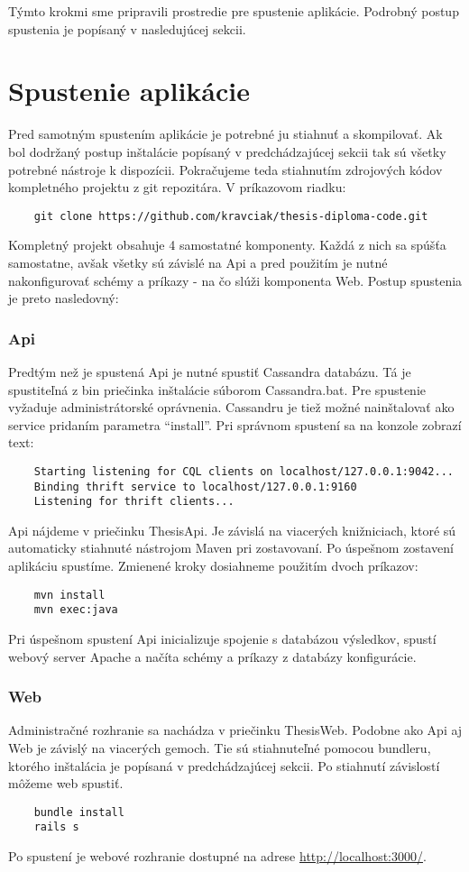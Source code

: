 	Týmto krokmi sme pripravili prostredie pre spustenie aplikácie. Podrobný postup spustenia je popísaný v nasledujúcej sekcii.

\section{Spustenie aplikácie}
	Pred samotným spustením aplikácie je potrebné ju stiahnuť a skompilovať. Ak bol dodržaný postup inštalácie popísaný v predchádzajúcej sekcii tak sú všetky potrebné nástroje k dispozícii. Pokračujeme teda stiahnutím zdrojových kódov kompletného projektu z git repozitára. V príkazovom riadku:
	\begin{lstlisting}
	git clone https://github.com/kravciak/thesis-diploma-code.git
	\end{lstlisting}
	Kompletný projekt obsahuje 4 samostatné komponenty. Každá z nich sa spúšťa samostatne, avšak všetky sú závislé na Api a pred použitím je nutné nakonfigurovať schémy a príkazy - na čo slúži komponenta Web. Postup spustenia je preto nasledovný:
	
\subsubsection{Api}
	Predtým než je spustená Api je nutné spustiť Cassandra databázu. Tá je spustiteľná z bin priečinka inštalácie súborom Cassandra.bat. Pre spustenie vyžaduje administrátorské oprávnenia. Cassandru je tiež možné nainštalovať ako service pridaním parametra ``install''. Pri správnom spustení sa na konzole zobrazí text:
	\begin{lstlisting}
	Starting listening for CQL clients on localhost/127.0.0.1:9042...
	Binding thrift service to localhost/127.0.0.1:9160
	Listening for thrift clients...
	\end{lstlisting}
	
	Api nájdeme v priečinku ThesisApi. Je závislá na viacerých knižniciach, ktoré sú automaticky stiahnuté nástrojom Maven pri zostavovaní. Po úspešnom zostavení aplikáciu spustíme. Zmienené kroky dosiahneme použitím dvoch príkazov:
	\begin{lstlisting}
	mvn install
	mvn exec:java
	\end{lstlisting}
	Pri úspešnom spustení Api inicializuje spojenie s databázou výsledkov, spustí webový server Apache a načíta schémy a príkazy z databázy konfigurácie.
	
\subsubsection{Web}
	Administračné rozhranie sa nachádza v priečinku ThesisWeb. Podobne ako Api aj Web je závislý na viacerých gemoch. Tie sú stiahnuteľné pomocou bundleru, ktorého inštalácia je popísaná v predchádzajúcej sekcii. Po stiahnutí závislostí môžeme web spustiť.
	\begin{lstlisting}
	bundle install
	rails s
	\end{lstlisting}
	Po spustení je webové rozhranie dostupné na adrese \url{http://localhost:3000/}.
		
